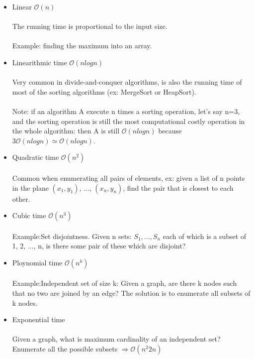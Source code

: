\documentclass[11pt]{article}
\begin{document}
\begin{itemize}

\item {Linear $\mathcal{O}{(n)}$}\\\\
The running time is proportional to the input size.\\\\
Example: finding the maximum into an array.

\item {Linearithmic time $\mathcal{O}{(nlogn)}$}\\\\
Very common in divide-and-conquer algorithms, is also the running time of most of the sorting algorithms (ex: MergeSort or HeapSort).\\\\
Note: if an algorithm A execute n times a sorting operation, let's say n=3, and the sorting operation is still the most computational costly operation in the whole algorithm: then A is still $\mathcal{O}{(nlogn)}$ because $3\mathcal{O}{(nlogn)} \simeq \mathcal {O}{(nlogn)}$.

\item {Quadratic time $\mathcal{O}{(n^{2})}$}\\\\
Common when enumerating all pairs of elements, ex: given a list of n points in the plane $(x_{1}, y_{1})$, ..., $(x_{n}, y_{n})$, find the pair that is closest to each other.

\item {Cubic time $\mathcal{O}{(n^{3})}$}\\\\
Example:Set disjointness. Given n sets: $S_{1}, ..., S_{n}$ each of which is a subset of 1, 2, ..., n, is there some pair of these which are disjoint?

\item {Ploynomial time $\mathcal{O}{(n^{k})}$}\\\\
Example:Independent set of size k: Given a graph, are there k nodes such that no two are joined by an edge? The solution is to enumerate all subsets of k nodes.

\item {Exponential time}\\\\
Given a graph, what is maximum cardinality of an independent set? Enumerate all the possible subsets $\Rightarrow \mathcal{O}{(n^{2} 2n)}$


\end{itemize}
\end{document}
